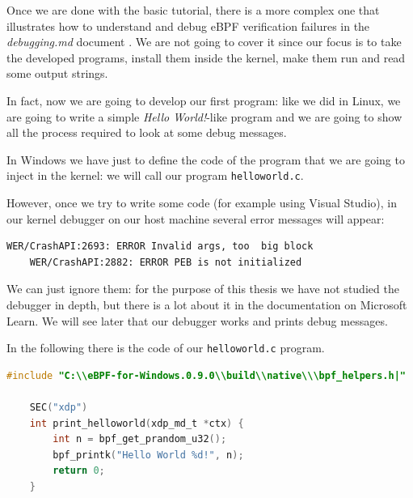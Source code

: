 Once we are done with the basic tutorial, there is a more complex one that illustrates how to understand and debug eBPF verification failures in the \textit{debugging.md} document \cite{DebugDoc}.
We are not going to cover it since our focus is to take the developed programs, install them inside the kernel, make them run and read some output strings.

In fact, now we are going to develop our first program: like we did in Linux, we are going to write a simple \textit{Hello World!}-like program and we are going to show all the process required to look at some debug messages.

In Windows we have just to define the code of the program that we are going to inject in the kernel: we will call our program \colorbox{backcolour}{\lstinline[style=commandline, language=bash, breaklines=true]|helloworld.c|}.

However, once we try to write some code (for example using Visual Studio), in our kernel debugger on our host machine several error messages will appear:

\begin{lstlisting}[style=commandline, language=bash, caption={Windows kernel debugger error messages.}]
	WER/CrashAPI:2693: ERROR Invalid args, too  big block
	WER/CrashAPI:2882: ERROR PEB is not initialized
\end{lstlisting}

We can just ignore them: for the purpose of this thesis we have not studied the debugger in depth, but there is a lot about it in the documentation on Microsoft Learn.
We will see later that our debugger works and prints debug messages.

In the following there is the code of our \colorbox{backcolour}{\lstinline[style=commandline, language=bash, breaklines=true]|helloworld.c|} program.

\begin{lstlisting}[style=cstyle, language=C, caption={Code of the ``Hello world!''-like kernel side program in ebpf-for-windows.}, title=helloworld.c]
	#include "C:\\eBPF-for-Windows.0.9.0\\build\\native\\\bpf_helpers.h|"
	
	SEC("xdp")
	int print_helloworld(xdp_md_t *ctx) {
		int n = bpf_get_prandom_u32();
		bpf_printk("Hello World %d!", n);
		return 0;
	}
\end{lstlisting}

